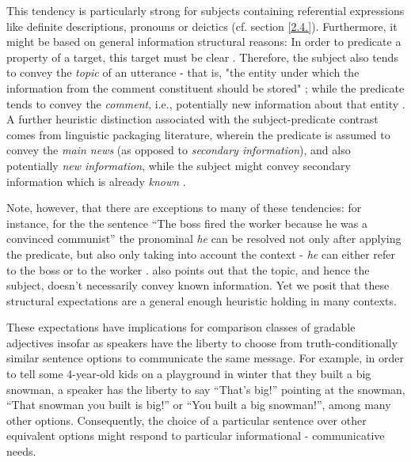 This tendency is particularly strong for subjects containing referential expressions like definite descriptions, pronouns or deictics (cf. section \ref{2.4.}). Furthermore, it might be based on general information structural reasons: In order to predicate a property of a target, this target must be clear \parencite{searle1969speech, krifka2008basic}. Therefore, the subject also tends to convey the \textit{topic} of an utterance - that is, "the entity under which the information from the comment constituent should be stored" \parencite[p.X]{krifka2008basic}; while the predicate tends to convey the \textit{comment},  i.e., potentially new information about that entity \parencite{krifka2008basic, chafe1976givenness, Reboul2001}. A further heuristic distinction associated with the subject-predicate contrast comes from linguistic packaging literature, wherein the predicate is assumed to convey the \textit{main news} (as opposed to \textit{secondary information}), and also potentially \textit{new information}, while the subject might convey secondary information which is already \textit{known} \parencite{kaiser2020}. 

Note, however, that there are exceptions to many of these tendencies: for instance, for the the sentence “The boss fired the worker because he was a convinced communist” the pronominal \emph{he} can be resolved not only after applying the predicate, but also only taking into account the context - \emph{he} can either refer to the boss or to the worker \parencite{Reboul2001}. \textcite{krifka2008basic} also points out that the topic, and hence the subject,  doesn't necessarily convey known information.
Yet we posit that these structural expectations are a general enough heuristic holding in many contexts.

These expectations have implications for comparison classes of gradable adjectives insofar as speakers have the liberty to choose from truth-conditionally similar sentence options to communicate the same message. For example, in order to tell some 4-year-old kids on a playground in winter that they built a big snowman, a speaker has the liberty to say “That’s big!” pointing at the snowman, “That snowman you built is big!” or “You built a big snowman!”, among many other options. Consequently, the choice of a particular sentence over other equivalent options might respond to particular informational - communicative needs. 

